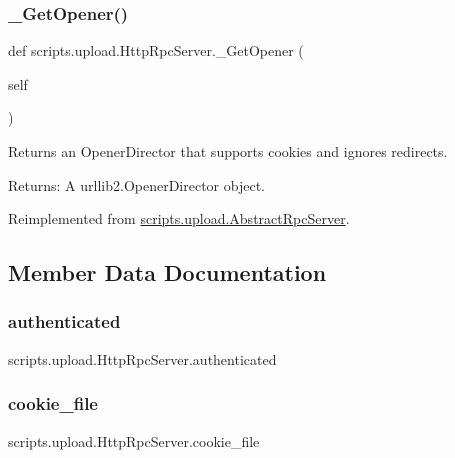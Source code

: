 \subsubsection{\texorpdfstring{\_GetOpener()}{\_GetOpener()}}
{\footnotesize\ttfamily def scripts.\+upload.\+Http\+Rpc\+Server.\+\_\+\+Get\+Opener (\begin{DoxyParamCaption}\item[{}]{self }\end{DoxyParamCaption})\hspace{0.3cm}{\ttfamily [private]}}

\begin{DoxyVerb}Returns an OpenerDirector that supports cookies and ignores redirects.

Returns:
  A urllib2.OpenerDirector object.
\end{DoxyVerb}
 

Reimplemented from \mbox{\hyperlink{classscripts_1_1upload_1_1_abstract_rpc_server_ab0cceb66841d2edd2090a448318eed17}{scripts.\+upload.\+Abstract\+Rpc\+Server}}.



\subsection{Member Data Documentation}
\mbox{\label{classscripts_1_1upload_1_1_http_rpc_server_afe678f980411f300ced8509b319e0df4}} 
\subsubsection{\texorpdfstring{authenticated}{authenticated}}
{\footnotesize\ttfamily scripts.\+upload.\+Http\+Rpc\+Server.\+authenticated}

\mbox{\label{classscripts_1_1upload_1_1_http_rpc_server_a0ee6fe5f647f2518d8c9a26732b9aed7}} 
\subsubsection{\texorpdfstring{cookie\_file}{cookie\_file}}
{\footnotesize\ttfamily scripts.\+upload.\+Http\+Rpc\+Server.\+cookie\+\_\+file}

